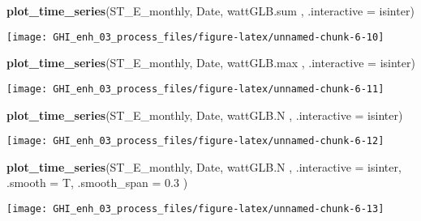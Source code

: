 \documentclass[
  10pt,
  a4paper,oneside]{article}
\newenvironment{Shaded}{\begin{snugshade}}{\end{snugshade}}
\newcommand{\AttributeTok}[1]{\textcolor[rgb]{0.13,0.29,0.53}{#1}}
\newcommand{\FloatTok}[1]{\textcolor[rgb]{0.00,0.00,0.81}{#1}}
\newcommand{\FunctionTok}[1]{\textcolor[rgb]{0.13,0.29,0.53}{\textbf{#1}}}
\newcommand{\NormalTok}[1]{#1}
\begin{document}
\begin{Shaded}
\begin{Highlighting}[]
\FunctionTok{plot\_time\_series}\NormalTok{(ST\_E\_monthly, Date, wattGLB.sum , }\AttributeTok{.interactive =}\NormalTok{ isinter)}
\end{Highlighting}
\end{Shaded}

\begin{center}\texttt{[image: GHI\_enh\_03\_process\_files/figure-latex/unnamed-chunk-6-10]} \end{center}

\begin{Shaded}
\begin{Highlighting}[]
\FunctionTok{plot\_time\_series}\NormalTok{(ST\_E\_monthly, Date, wattGLB.max , }\AttributeTok{.interactive =}\NormalTok{ isinter)}
\end{Highlighting}
\end{Shaded}

\begin{center}\texttt{[image: GHI\_enh\_03\_process\_files/figure-latex/unnamed-chunk-6-11]} \end{center}

\begin{Shaded}
\begin{Highlighting}[]
\FunctionTok{plot\_time\_series}\NormalTok{(ST\_E\_monthly, Date, wattGLB.N   , }\AttributeTok{.interactive =}\NormalTok{ isinter)}
\end{Highlighting}
\end{Shaded}

\begin{center}\texttt{[image: GHI\_enh\_03\_process\_files/figure-latex/unnamed-chunk-6-12]} \end{center}

\begin{Shaded}
\begin{Highlighting}[]
\FunctionTok{plot\_time\_series}\NormalTok{(ST\_E\_monthly, Date, wattGLB.N   , }\AttributeTok{.interactive =}\NormalTok{ isinter, }\AttributeTok{.smooth =}\NormalTok{ T, }\AttributeTok{.smooth\_span =} \FloatTok{0.3}\NormalTok{ )}
\end{Highlighting}
\end{Shaded}

\begin{center}\texttt{[image: GHI\_enh\_03\_process\_files/figure-latex/unnamed-chunk-6-13]} \end{center}
\end{document}
